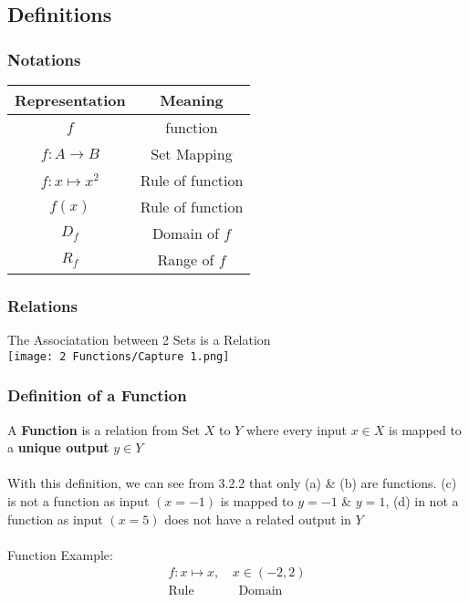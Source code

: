 \documentclass[../main.tex]{subfiles}
\begin{document}
\subsection{Definitions}
\subsubsection{Notations}
\begin{tabular}{|c|c|}
    \hline
    \textbf{Representation} & \textbf{Meaning} \\
    \hline
    \(f\) & function \\
    \hline
    \(f:A \to B\) & Set Mapping \\
    \hline
    \(f:x \mapsto x^2\) & Rule of function \\
    \hline
    \(f(x)\) & Rule of function \\
    \hline
    \(D_{f}\) & Domain of \(f\) \\
    \hline
    \(R_{f}\) & Range of \(f\) \\
    \hline
\end{tabular}
\newpage \noindent

\subsubsection{Relations}
The Associatation between 2 Sets is a Relation \\
\texttt{[image: 2 Functions/Capture 1.png]}

\subsubsection{Definition of a Function}
A \textbf{Function} is a relation from Set \(X\) to \(Y\) where every input \(x \in X\) is mapped to a \textbf{unique output} \(y \in Y\) \\\\
With this definition, we can see from 3.2.2 that only (a) \& (b) are functions.
(c) is not a function as input \((x=-1)\) is mapped to \(y=-1\) \& \(y=1\), (d) in
not a function as input \((x=5)\) does not have a related output in \(Y\) \\\\
Function Example:
\begin{align*}
    \displaystyle f:x \mapsto x, \, & x \in (-2,2) \\
        \text{Rule}\phantom{spa} & \phantom{s }\text{Domain}
\end{align*}
\end{document}

